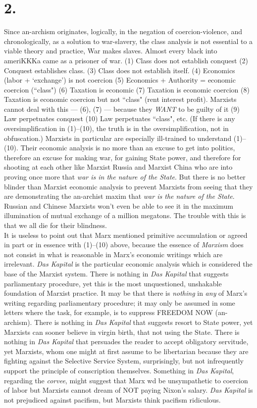 \documentclass[12pt, onecolumn, letterpaper, oneside]{book}
\begin{document}
\section*{2.}
Since an-archism originates, logically, in the negation of coercion-violence, and chronologically, as a solution to war-slavery, the class analysis is not essential to a viable theory and practice, War makes slaves. Almost every black into ameriKKKa came as a prisoner of war. (1) Class does not establish conquest (2) Conquest establishes class. (3) Class does not establish itself. (4) Economics (labor + `exchange') is not coercion (5) Economics + Authority  = economic coercion (``class") (6) Taxation is economic (7) Taxation is economic coercion (8) Taxation is economic coercion but not ``class" (rent interest profit). Marxists cannot deal with this --- (6), (7) --- because they \emph{WANT} to be guilty of it (9) Law perpetuates conquest (10) Law perpetuates ``class", etc. (If there is any oversimplification in (1)--(10), the truth is in the oversimplification, not in obfuscation.) Marxists in particular are especially ill-trained to understand (1)--(10). Their economic analysis is no more than an excuse to get into politics, therefore an excuse for making war, for gaining State power, and therefore for shooting at each other like Marxist Russia and Marxist China who are into proving once more that \emph{war is in the nature of the State}. But there is no better blinder than Marxist economic analysis to prevent Marxists from seeing that they are demonstrating the an-archist maxim that \emph{war is the nature of the State}. Russian and Chinese Marxists won't even be able to see it in the maximum illumination of mutual exchange of a million megatons. The trouble with this is that we all die for their blindness.\\
It is useless to point out that Marx mentioned primitive accumulation or agreed in part or in essence with (1)--(10) above, because the essence of \emph{Marxism} does not consist in what is reasonable in Marx's economic writings which are irrelevant. \emph{Das Kapital} is the particular economic analysis which is considered the base of the Marxist system. There is nothing in \emph{Das Kapital} that suggests parliamentary procedure, yet this is the most unquestioned, unshakable foundation of Marxist practice. It may be that there is \emph{nothing} in \emph{any} of Marx's writing regarding parliamentary procedure; it may only be assumed in some letters where the task, for example, is to suppress FREEDOM NOW (an-archism). There is nothing in \emph{Das Kapital} that suggests resort to State power, yet Marxists can sooner believe in virgin birth, that not using the State. There is nothing in \emph{Das Kapital} that persuades the reader to accept obligatory servitude, yet Marxists, whom one might at first assume to be libertarian because they are fighting against the Selective Service System, surprisingly, but not infrequently support the principle of conscription themselves. Something in \emph{Das Kapital}, regarding the \emph{corvee}, might suggest that Marx wd be unsympathetic to coercion of labor but Marxists cannot dream of NOT paying Nixon's salary. \emph{Das Kapital} is not prejudiced against pacifism, but Marxists think pacifism ridiculous.\\
\end{document}
